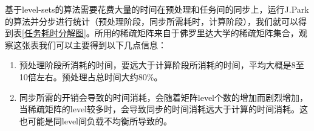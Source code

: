 \begin{table}[]
    \caption{基于level-sets算法\cite{park2014sparsifying}的任务耗时(ms)分解表}
    \label{任务耗时分解图}
\end{table}


基于level-sets的算法需要花费大量的时间在预处理和任务间的同步上，运行J.Park的算法并分步进行统计（预处理阶段，同步所需耗时，计算阶段），我们就可以得到表\ref{任务耗时分解图}。所用的稀疏矩阵来自于佛罗里达大学的稀疏矩阵集合\cite{davis2011university}，观察这张表我们可以主要得到以下几点信息：
\begin{enumerate} \setlength{\itemsep}{0pt}
\item 预处理阶段所消耗的时间，要远大于计算阶段所消耗的时间，平均大概是8至10倍左右。预处理占总时间大约80\%。
\item 同步所需的开销会导致的时间消耗，会随着矩阵level个数的增加而剧烈增加，当稀疏矩阵的level较多时，会导致同步的时间消耗远大于计算的时间消耗。这也可能是同level间负载不均衡所导致的。
\end{enumerate}

